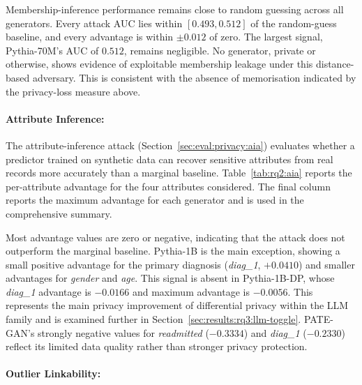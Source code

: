 Membership-inference performance remains close to random guessing across
all generators. Every attack AUC lies within $[0.493, 0.512]$ of the
random-guess baseline, and every advantage is within $\pm 0.012$ of zero.
The largest signal, Pythia-70M's AUC of
$0.512$, remains negligible. No generator, private or otherwise, shows
evidence of exploitable membership leakage under this distance-based
adversary. This is consistent with the absence of memorisation indicated
by the privacy-loss measure above.

\paragraph{Attribute Inference:}
\label{sec:results:rq2:privacy:aia}

The attribute-inference attack
(Section~\ref{sec:eval:privacy:aia}) evaluates whether a predictor trained
on synthetic data can recover sensitive attributes from real records more
accurately than a marginal baseline. Table~\ref{tab:rq2:aia} reports 
the per-attribute advantage for
the four attributes considered. The final column reports the 
maximum advantage for each generator and is
used in the comprehensive summary.

\begin{table}[H]
\centering
\small
\caption{Attribute-inference advantage per generator and attribute
(positive values indicate leakage above the marginal baseline). The
final column is the per-generator maximum advantage.}
\label{tab:rq2:aia}

\end{table}

Most advantage values are zero or negative, indicating that the attack
does not outperform the marginal baseline. Pythia-1B is the main
exception, showing a small positive advantage for the primary diagnosis
(\emph{diag\_1}, $+0.0410$) and smaller advantages for \emph{gender} and
\emph{age}. This signal is absent in Pythia-1B-DP, whose \emph{diag\_1}
advantage is $-0.0166$ and maximum advantage is $-0.0056$. This represents
the main privacy improvement of differential privacy within the LLM
family and is examined further in
Section~\ref{sec:results:rq3:llm-toggle}. PATE-GAN's strongly negative
values for \emph{readmitted} ($-0.3334$) and \emph{diag\_1} ($-0.2330$)
reflect its limited data quality rather than stronger privacy protection.

\paragraph{Outlier Linkability:}
\label{sec:results:rq2:privacy:linkability}

